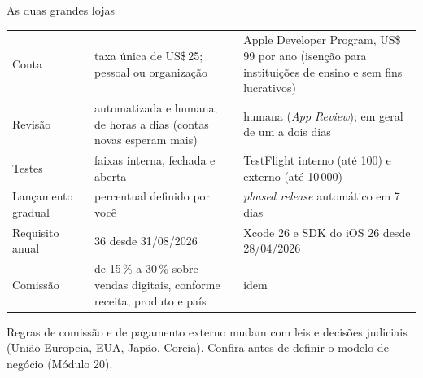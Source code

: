 \begin{frame}{As duas grandes lojas}
  \scriptsize
  \begin{tabularx}{\textwidth}{@{}p{2.6cm} L L@{}}
    \toprule
    &  &  \\
    \midrule
    Conta & taxa única de US\$\,25; pessoal ou organização & Apple Developer Program, US\$\,99 por ano (isenção para instituições de ensino e sem fins lucrativos) \\
    Revisão & automatizada e humana; de horas a dias (contas novas esperam mais) & humana (\emph{App Review}); em geral de um a dois dias \\
    Testes & faixas interna, fechada e aberta & TestFlight interno (até 100) e externo (até 10\,000) \\
    Lançamento gradual & percentual definido por você & \emph{phased release} automático em 7 dias \\
    Requisito anual &  36 desde 31/08/2026 & Xcode 26 e SDK do iOS 26 desde 28/04/2026 \\
    Comissão & de 15\,\% a 30\,\% sobre vendas digitais, conforme receita, produto e país & idem \\
    \bottomrule
  \end{tabularx}
  \vspace{4pt}
  \begin{dica}
    Regras de comissão e de pagamento externo mudam com leis e decisões judiciais (União Europeia, EUA, Japão, Coreia). Confira antes de definir o modelo de negócio (Módulo 20).
  \end{dica}
\end{frame}

